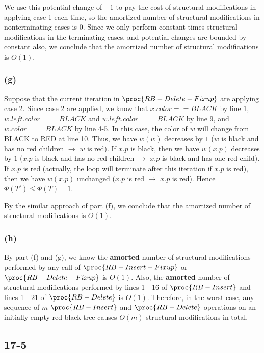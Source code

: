 We use this potential change of $-1$ to 
pay the cost of structural modifications in applying case 1 each time,
so the amortized number of structural modifications in nonterminating cases is $0$.
Since we only perform constant times structural modifications in the terminating cases,
and potential changes are bounded by constant also,
we conclude that the amortized number of structural modifications is $O(1)$.

\subsubsection*{(g)}

Suppose that the current iteration in $\proc{RB-Delete-Fixup}$ are applying case 2.
Since case 2 are applied, we know that $x.color == BLACK$ by line 1,
$w.left.color == BLACK$ and $w.left.color == BLACK$ by line 9,
and $w.color == BLACK$ by line 4-5.
In this case, the color of $w$ will change from BLACK to RED at line 10.
Thus, we have 
$w(w)$ decreases by $1$ ($w$ is black and has no red children $\rightarrow$ $w$ is red).
If $x.p$ is black, then we have $w(x.p)$ decreases by $1$ 
($x.p$ is black and has no red children $\rightarrow$ $x.p$ is black and has one red child).
If $x.p$ is red (actually, the loop will terminate after this iteration if $x.p$ is red), 
then we have $w(x.p)$ unchanged ($x.p$ is red $\rightarrow$ $x.p$ is red).
Hence $\Phi(T') \leq \Phi(T) - 1$.

By the similar approach of part (f),
we conclude that the amortized number of structural modifications is $O(1)$.

\subsubsection*{(h)}

By part (f) and (g), we know the \textbf{amorted} number of structural modifications performed by
any call of $\proc{RB-Insert-Fixup}$ or $\proc{RB-Delete-Fixup}$ is $O(1)$.
Also, the \textbf{amorted} number of structural modifications performed by 
lines 1 - 16 of $\proc{RB-Insert}$ and lines 1 - 21 of $\proc{RB-Delete}$ is $O(1)$.
Therefore, in the worst case, 
any sequence of $m$ $\proc{RB-Insert}$ and $\proc{RB-Delete}$ operations
on an initially empty red-black tree causes $O(m)$ structural modifications in total.

\subsection*{17-5}

